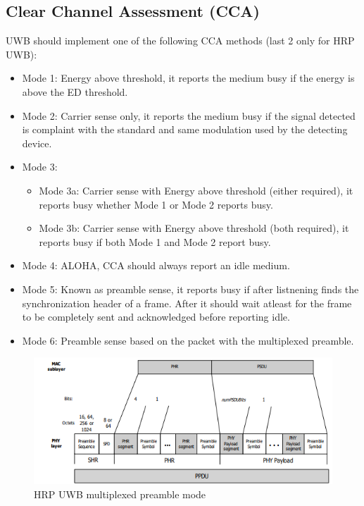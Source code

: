 \documentclass[conference]{IEEEtran}
\begin{document}
\subsection{Clear Channel Assessment (CCA)}
UWB should implement one of the following CCA methods (last 2 only for HRP UWB):
\begin{itemize}
    \item Mode 1: Energy above threshold, it reports the medium busy if the energy is above
          the ED threshold.
    \item Mode 2: Carrier sense only, it reports the medium busy if the signal detected is
          complaint with the standard\cite{10794632} and same modulation used by the detecting device.
    \item Mode 3:
    \begin{itemize}
      \item Mode 3a: Carrier sense with Energy above threshold (either required), it reports 
            busy whether Mode 1 or Mode 2 reports busy.
      \item Mode 3b: Carrier sense with Energy above threshold (both required), it reports 
            busy if both Mode 1 and Mode 2 report busy.
    \end{itemize}
    \item Mode 4: ALOHA, CCA should always report an idle medium.
    \item Mode 5: Known as preamble sense, it reports busy if after listnening finds the 
          synchronization header of a frame. After it should wait atleast for the frame to be
          completely sent and acknowledged before reporting idle.
    \item Mode 6: Preamble sense based on the packet with the multiplexed preamble.
\end{itemize}

\begin{figure}[!h]
  \centering
  \includegraphics[width=\linewidth]{Mutliplexed-preamble}
  \caption{HRP UWB multiplexed preamble mode}
  \label{fig:Multiplexed-preamble}
\end{figure}
\end{document}

